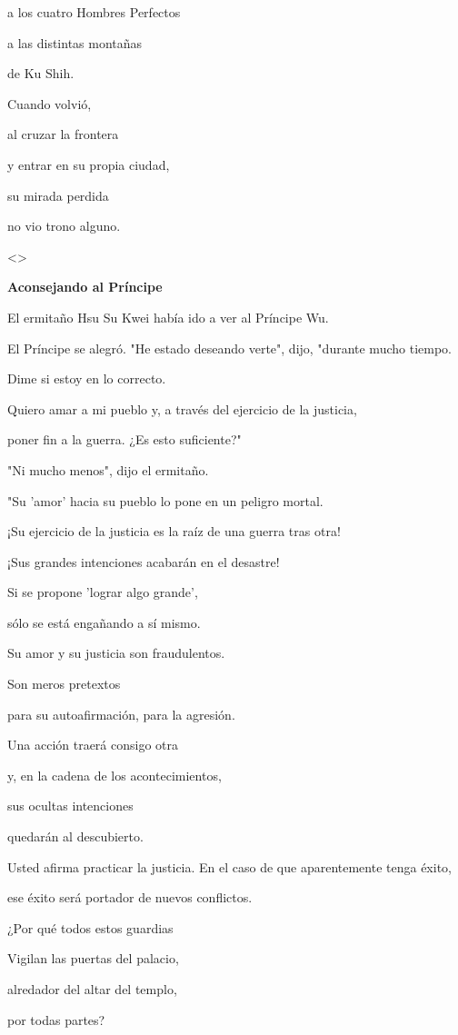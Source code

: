 a los cuatro Hombres Perfectos

a las distintas montañas

de Ku Shih.

Cuando volvió,

al cruzar la frontera

y entrar en su propia ciudad,

su mirada perdida

no vio trono alguno.

\textless\textgreater{}

\textbf{{Aconsejando al Príncipe}}

El ermitaño Hsu Su Kwei había ido a ver al Príncipe Wu.

El Príncipe se alegró. "He estado deseando verte", dijo, "durante mucho
tiempo.

Dime si estoy en lo correcto.

Quiero amar a mi pueblo y, a través del ejercicio de la justicia,

poner fin a la guerra. ¿Es esto suficiente?"

"Ni mucho menos", dijo el ermitaño.

"Su 'amor' hacia su pueblo lo pone en un peligro mortal.

¡Su ejercicio de la justicia es la raíz de una guerra tras otra!

¡Sus grandes intenciones acabarán en el desastre!

Si se propone 'lograr algo grande',

sólo se está engañando a sí mismo.

Su amor y su justicia son fraudulentos.

Son meros pretextos

para su autoafirmación, para la agresión.

Una acción traerá consigo otra

y, en la cadena de los acontecimientos,

sus ocultas intenciones

quedarán al descubierto.

Usted afirma practicar la justicia. En el caso de que aparentemente
tenga éxito,

ese éxito será portador de nuevos conflictos.

¿Por qué todos estos guardias

Vigilan las puertas del palacio,

alredador del altar del templo,

por todas partes?

